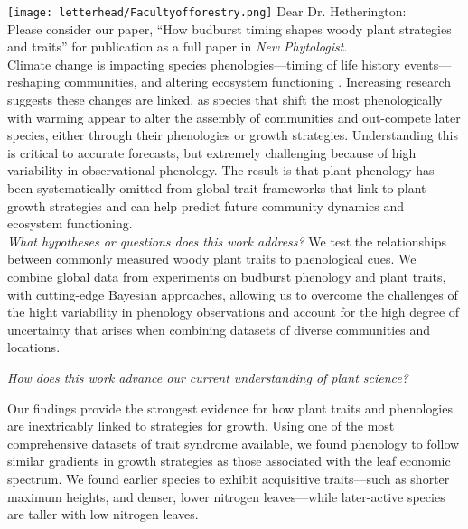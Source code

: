 \documentclass[11pt,a4paper]{article}
\begin{document}
\noindent \texttt{[image: letterhead/Facultyofforestry.png]}
\noindent Dear Dr. Hetherington:
\vspace{1.5ex}\\

\noindent Please consider our paper, ``How budburst timing shapes woody plant strategies and traits'' for publication as a full paper in \emph{New Phytologist}. 
\vspace{1.5ex}\\ 

\noindent Climate change is impacting species phenologies---timing of life history events---reshaping communities, and altering ecosystem functioning \citep{Cleland2007a,Beard2019,Gu2022}. Increasing research suggests these changes are linked, as species that shift the most phenologically with warming appear to alter the assembly of communities and out-compete later species, either through their phenologies or growth strategies. Understanding this is critical to accurate forecasts, but extremely challenging because of high variability in observational phenology. The result is that plant phenology has been systematically omitted from global trait frameworks that link to plant growth strategies and can help predict future community dynamics and ecosystem functioning.
\vspace{1.5ex}\\

\emph{What hypotheses or questions does this work address?} We test the relationships between commonly measured woody plant traits to phenological cues. We combine global data from experiments on budburst phenology and plant traits, with cutting-edge Bayesian approaches, allowing us to overcome the challenges of the hight variability in phenology observations and account for the high degree of uncertainty that arises when combining datasets of diverse communities and locations.

\emph{How does this work advance our current understanding of plant science?} 


Our findings provide the strongest evidence for how plant traits and phenologies are inextricably linked to strategies for growth. Using one of the most comprehensive datasets of trait syndrome available, we found phenology to follow similar gradients in growth strategies as those associated with the leaf economic spectrum. We found earlier species to exhibit acquisitive traits---such as shorter maximum heights, and denser, lower nitrogen leaves---while later-active species are taller with low nitrogen leaves. 
\end{document}
